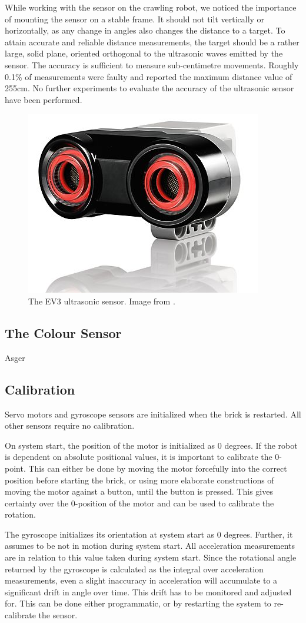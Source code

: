 \documentclass[11pt, a4paper]{article}
\begin{document}
While working with the sensor on the crawling robot, we noticed the importance of mounting the sensor on a stable frame. It should not tilt vertically or horizontally, as any change in angles also changes the distance to a target. To attain accurate and reliable distance measurements, the target should be a rather large, solid plane, oriented orthogonal to the ultrasonic waves emitted by the sensor. The accuracy is sufficient to measure sub-centimetre movements. Roughly 0.1\% of measurements were faulty and reported the maximum distance value of 255cm. No further experiments to evaluate the accuracy of the ultrasonic sensor have been performed.

\begin{figure}[H]
	\centering
	\includegraphics[width=0.3\linewidth]{images/ultrasonic}
	\caption{The EV3 ultrasonic sensor. Image from \cite{ultraosnic_sensor}.}
	\label{fig:ultrasonic}
\end{figure}


\subsection{The Colour Sensor}
Asger

\subsection{Calibration} \label{calibration}
Servo motors and gyroscope sensors are initialized when the brick is restarted. All other sensors require no calibration.

On system start, the position of the motor is initialized as 0 degrees. If the robot is dependent on absolute positional values, it is important to calibrate the 0-point. This can either be done by moving the motor forcefully into the correct position before starting the brick, or using more elaborate constructions of moving the motor against a button, until the button is pressed. This gives certainty over the 0-position of the motor and can be used to calibrate the rotation.

The gyroscope initializes its orientation at system start as 0 degrees. Further, it assumes to be not in motion during system start. All acceleration measurements are in relation to this value taken during system start. Since the rotational angle returned by the gyroscope is calculated as the integral over acceleration measurements, even a slight inaccuracy in acceleration will accumulate to a significant drift in angle over time. This drift has to be monitored and adjusted for. This can be done either programmatic, or by restarting the system to re-calibrate the sensor.
\end{document}
